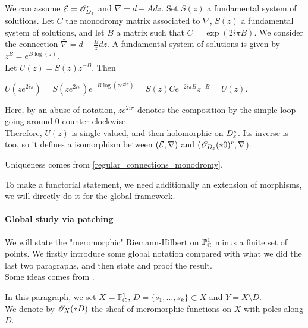 \begin{mydemo}
We can assume $\mathcal{E} = \mathscr{O}_{D_\varepsilon}^r$ and $\nabla = d - Adz$. Set $S(z)$ a fundamental system of solutions. Let $C$ the monodromy matrix associated to $\nabla$, $S(z)$ a fundamental system of solutions, and let $B$ a matrix such that $C = \exp(2i\pi B)$. We consider the connection $\bar{\nabla} = d - \frac{B}{z}dz$. A fundamental system of solutions is given by $z^B = e^{B\log(z)}$.\\
Let $U(z) = S(z)z^{-B}$. Then 
\begin{center}
$U(ze^{2i\pi}) = S(ze^{2i\pi})e^{-B\log(ze^{2i\pi})} = S(z)C e^{-2i\pi B}z^{-B} = U(z)$.
\end{center}
Here, by an abuse of notation, $z e^{2i\pi}$ denotes the composition by the simple loop going around 0 counter-clockwise.\\
Therefore, $U(z)$ is single-valued, and then holomorphic on $D_\varepsilon^*$. Its inverse is too, so it defines a isomorphism between $(\mathcal{E},\nabla)$ and $(\mathscr{O}_{D_\varepsilon}(*0)^r,\bar{\nabla}$).

\smallskip
Uniqueness comes from \ref{regular_connections_monodromy}.
\end{mydemo}


To make a functorial statement, we need additionally an extension of morphisms, we will directly do it for the global framework.















\paragraph{Global study via patching}

We will state the "meromorphic" Riemann-Hilbert on $\mathbb{P}^1_{\mathbb{C}}$ minus a finite set of points. We firstly introduce some global notation compared with what we did the last two paragraphs, and then state and proof the result.\\
Some ideas comes from \cite{szamuely_galois}.

\medskip
In this paragraph, we set $X = \mathbb{P}^1_{\mathbb{C}}$, $D = \{s_1,\dots,s_k\} \subset X$ and $Y = X \setminus D$.\\
We denote by $\mathscr{O}_X(*D)$ the sheaf of meromorphic functions on $X$ with poles along $D$.



